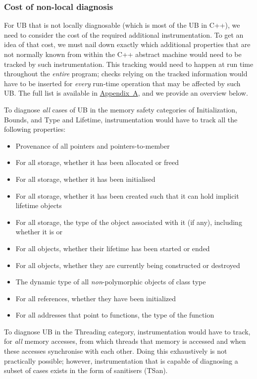 \subsubsection{Cost of non-local diagnosis}
\label{cost_nonlocal}

For UB that is not locally diagnosable (which is most of the UB in C++), we need to consider the cost of the required additional instrumentation. To get an idea of that cost, we must nail down exactly which additional properties that are not normally known from within the C++ abstract machine would need to be tracked by such instrumentation. This tracking would need to happen at run time throughout the \emph{entire} program; checks relying on the tracked information would have to be inserted for \emph{every} run-time operation that may be affected by such UB.
The full list is available in \hyperref[appendix]{Appendix~A}, and we provide an overview below.

To diagnose \emph{all} cases of UB in the memory safety categories of Initialization, Bounds, and Type and Lifetime, instrumentation would have to track all the following properties:

\begin{itemize}
\item Provenance of all pointers and pointers-to-member
\item For all storage, whether it has been allocated or freed
\item For all storage, whether it has been initialised
\item For all storage, whether it has been created such that it can hold implicit lifetime objects
\item For all storage, the type of the object associated with it (if any), including whether it is  or 
\item For all objects, whether their lifetime has been started or ended
\item For all objects, whether they are currently being constructed or destroyed
\item The dynamic type of all \emph{non}-polymorphic objects of class type
\item For all references, whether they have been initialized
\item For all addresses that point to  functions, the type of the function
\end{itemize}

To diagnose UB in the Threading category, instrumentation would have to track, for \emph{all} memory accesses, from which threads that memory is accessed and when these accesses synchronise with each other. Doing this exhaustively is not practically possible; however, instrumentation that is capable of diagnosing a subset of cases exists in the form of sanitisers (TSan).


